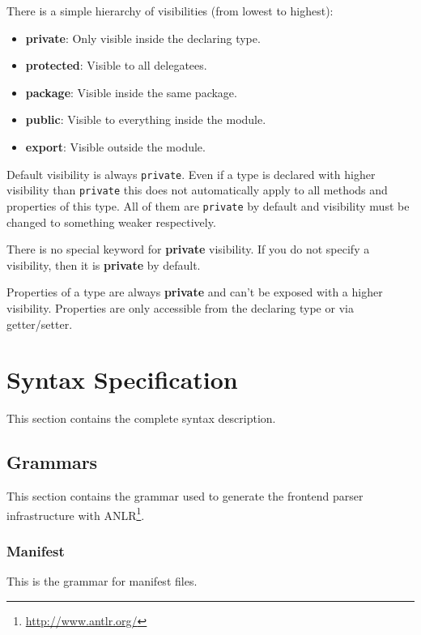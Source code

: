 \documentclass[11pt,a4paper]{report}
\begin{document}
There is a simple hierarchy of visibilities (from lowest to highest):

\begin{itemize}
    \item \textbf{private}: Only visible inside the declaring type.
    \item \textbf{protected}: Visible to all delegatees.
    \item \textbf{package}: Visible inside the same package.
    \item \textbf{public}: Visible to everything inside the module.
    \item \textbf{export}: Visible outside the module.
\end{itemize}

Default visibility is always \texttt{private}. Even if a type is declared with higher visibility than \texttt{private} this does not automatically apply to all methods and properties of this type. All of them are \texttt{private} by default and visibility must be changed to something weaker respectively.

There is no special keyword for \textbf{private} visibility. If you do not specify a visibility, then it is \textbf{private} by default.

Properties of a type are always \textbf{private} and can't be exposed with a higher visibility. Properties are only accessible from the declaring type or via getter/setter.

\chapter{Syntax Specification}

This section contains the complete syntax description.

\section{Grammars}

This section contains the grammar used to generate the frontend parser infrastructure with ANLR\footnote{\url{http://www.antlr.org/}}.

\subsection{Manifest}

This is the grammar for manifest files.


\end{document}
